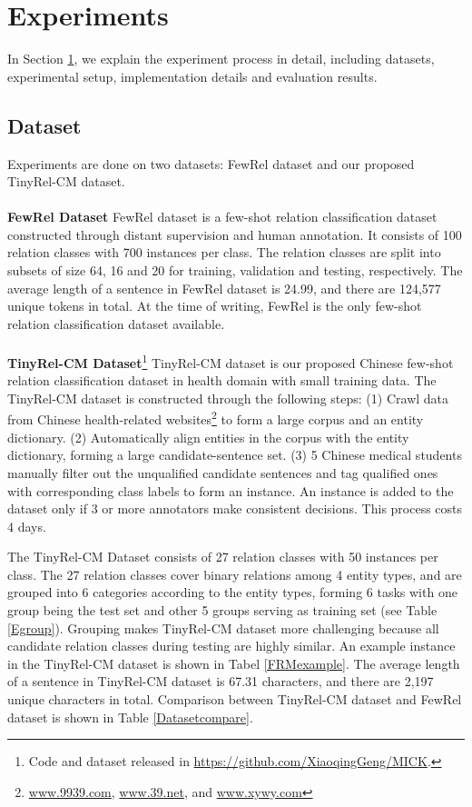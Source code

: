 \section{Experiments}
\label{exp}
In Section \ref{exp}, we explain the experiment process in detail, including datasets, experimental setup, implementation details and evaluation results.

\subsection{Dataset}
\label{dataset}
Experiments are done on two datasets: FewRel dataset \cite{han-etal-2018-fewrel} and our proposed TinyRel-CM dataset.
~\\
~\\
\textbf{FewRel Dataset} FewRel dataset \cite{han-etal-2018-fewrel} is a few-shot relation classification dataset constructed through distant supervision and human annotation. It consists of 100 relation classes with 700 instances per class. The relation classes are split into subsets of size 64, 16 and 20 for training, validation and testing, respectively.
The average length of a sentence in FewRel dataset is 24.99, and there are 124,577 unique tokens in total. At the time of writing, FewRel is the only few-shot relation classification dataset available.
~\\
~\\
\textbf{TinyRel-CM Dataset}\footnote{Code and dataset released in \url{https://github.com/XiaoqingGeng/MICK}.} TinyRel-CM dataset is our proposed Chinese few-shot relation classification dataset in health domain with small training data. The TinyRel-CM dataset is constructed through the following steps: (1) Crawl data from Chinese health-related websites\footnote{\url{www.9939.com}, \url{www.39.net}, and \url{www.xywy.com}} to form a large corpus and an entity dictionary. (2) Automatically align entities in the corpus with the entity dictionary, forming a large candidate-sentence set. (3) 5 Chinese medical students manually filter out the unqualified candidate sentences and tag qualified ones with corresponding class labels to form an instance. An instance is added to the dataset only if 3 or more annotators make consistent decisions. This process costs 4 days.

The TinyRel-CM Dataset consists of 27 relation classes with 50 instances per class. The 27 relation classes cover binary relations among 4 entity types, and are grouped into 6 categories according to the entity types, forming 6 tasks with one group being the test set and other 5 groups serving as training set (see Table \ref{Egroup}). Grouping makes TinyRel-CM dataset more challenging because all candidate relation classes during testing are highly similar. An example instance in the TinyRel-CM dataset is shown in Tabel \ref{FRMexample}. The average length of a sentence in TinyRel-CM dataset is 67.31 characters, and there are 2,197 unique characters in total. Comparison between TinyRel-CM dataset and FewRel dataset is shown in Table \ref{Datasetcompare}.

